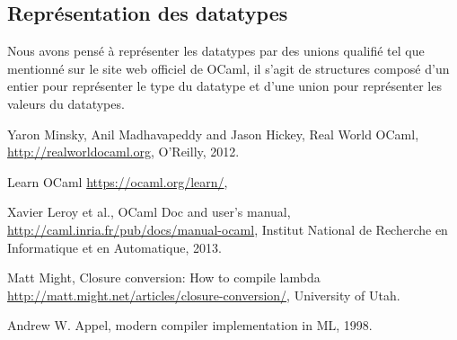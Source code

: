 \documentclass{article}
\begin{document}
\subsection{Représentation des datatypes}
Nous avons pensé à représenter les datatypes par des unions qualifié tel que
mentionné sur le site web officiel de OCaml, il s'agit de structures composé
d'un entier pour représenter le type du datatype et d'une union pour
représenter les valeurs du datatypes.

\begin{thebibliography}{9}

	Yaron Minsky, Anil Madhavapeddy and Jason Hickey,
	Real World OCaml,
	\url{http://realworldocaml.org},
	O'Reilly,
	2012.

	Learn OCaml
	\url{https://ocaml.org/learn/},

	Xavier Leroy et al.,
	OCaml Doc and user's manual,
	\url{http://caml.inria.fr/pub/docs/manual-ocaml},
	Institut National de Recherche en Informatique et en Automatique,
	2013.

	Matt Might,
  Closure conversion: How to compile lambda
	\url{http://matt.might.net/articles/closure-conversion/},
  University of Utah.
   
    Andrew W. Appel,
    modern compiler implementation in ML,
    1998.

\end{thebibliography}
\end{document}
